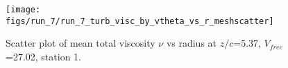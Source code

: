 \begin{figure}[H]
\centering
\texttt{[image: figs/run\_7/run\_7\_turb\_visc\_by\_vtheta\_vs\_r\_meshscatter]}
\caption{Scatter plot of mean total viscosity $\nu$ vs radius at $z/c$=5.37, $V_{free}$=27.02, station 1.}
\label{fig:run_7_turb_visc_by_vtheta_vs_r_meshscatter}
\end{figure}


